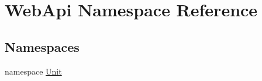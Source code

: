 \hypertarget{namespace_web_api}{}\section{Web\+Api Namespace Reference}
\label{namespace_web_api}
\subsection*{Namespaces}
\begin{DoxyCompactItemize}
\item 
namespace \mbox{\hyperlink{namespace_web_api_1_1_unit}{Unit}}
\end{DoxyCompactItemize}
